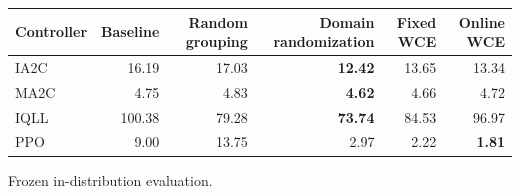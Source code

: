 \begin{tabular}{lrrrrr}
\hline
Controller & Baseline & Random grouping & Domain randomization & Fixed WCE & Online WCE \\
\hline
IA2C & 16.19 & 17.03 & \textbf{12.42} & 13.65 & 13.34 \\
MA2C & 4.75 & 4.83 & \textbf{4.62} & 4.66 & 4.72 \\
IQLL & 100.38 & 79.28 & \textbf{73.74} & 84.53 & 96.97 \\
PPO & 9.00 & 13.75 & 2.97 & 2.22 & \textbf{1.81} \\
\hline
\end{tabular}
Frozen in-distribution evaluation.
